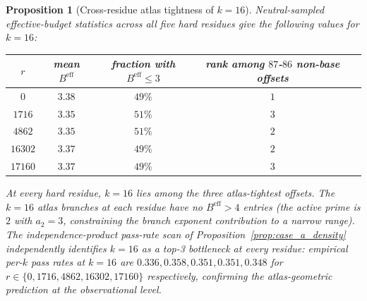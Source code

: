 \documentclass[11pt]{article}
\renewcommand{\_}{\origunderscore\allowbreak}
\newtheorem{proposition}[theorem]{Proposition}
\theoremstyle{definition}
\theoremstyle{remark}
\begin{document}
\begin{proposition}[Cross-residue atlas tightness of $k=16$]\label{prop:k16_universal}
Neutral-sampled effective-budget statistics across all five hard
residues give the following values for $k=16$:
\begin{center}
\renewcommand{\arraystretch}{1.05}
\begin{tabular}{c|cccc}
\hline
$r$ & mean $B^{\mathrm{eff}}$ & fraction with $B^{\mathrm{eff}}\le 3$ & rank among $87$-$86$ non-base offsets \\
\hline
$0$      & $3.38$ & $49\%$ & $1$ \\
$1716$   & $3.35$ & $51\%$ & $3$ \\
$4862$   & $3.35$ & $51\%$ & $2$ \\
$16302$  & $3.37$ & $49\%$ & $2$ \\
$17160$  & $3.37$ & $49\%$ & $3$ \\
\hline
\end{tabular}
\end{center}
At every hard residue, $k=16$ lies among the three atlas-tightest
offsets. The $k=16$ atlas branches at each residue have no
$B^{\mathrm{eff}}>4$ entries (the active prime is $2$ with $a_2 = 3$,
constraining the branch exponent contribution to a narrow range).
The independence-product pass-rate scan of
Proposition~\ref{prop:case_a_density} independently identifies
$k=16$ as a top-3 bottleneck at every residue: empirical per-$k$
pass rates at $k=16$ are $0.336, 0.358, 0.351, 0.351, 0.348$
for $r\in\{0,1716,4862,16302,17160\}$ respectively, confirming the
atlas-geometric prediction at the observational level.
\end{proposition}
\end{document}
